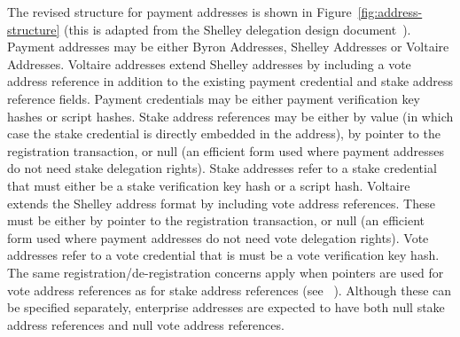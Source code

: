 The revised structure for payment addresses is shown in Figure~\ref{fig:address-structure} (this is adapted from the Shelley delegation design document~\cite{delegation-design}).
Payment addresses may be either Byron Addresses, Shelley Addresses or Voltaire Addresses.
Voltaire addresses extend Shelley addresses by including a vote address reference in addition to the existing payment credential and stake address
reference fields.  Payment credentials may be either payment verification key hashes or script hashes.  Stake address references may be either
by value (in which case the stake credential is directly embedded in the address), by pointer to the registration transaction, or null (an efficient
form used where payment addresses do not need stake delegation rights).
Stake addresses refer to a stake credential that must either be a stake verification key hash or a script hash.
Voltaire extends the Shelley address format by including vote address references.  These must be either by pointer to the registration transaction, or null (an efficient
form used where payment addresses do not need vote delegation rights).
Vote addresses refer to a vote credential that is must be a vote verification key hash.
The same registration/de-registration concerns apply when pointers are used for vote address references as for stake address references (see ~\cite{delegation-design}).
Although these can be specified separately, enterprise addresses are expected to have both null stake address references and null vote address references.

